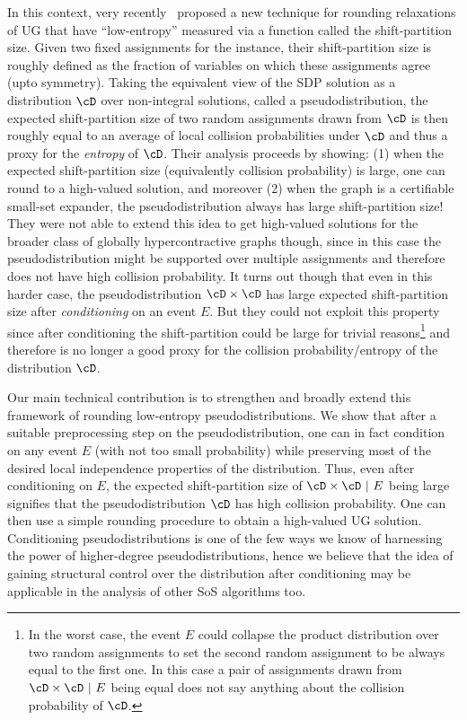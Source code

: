 In this context, very recently~\cite{BBKSS} proposed a new technique for rounding relaxations of UG that have ``low-entropy'' measured via a function called the shift-partition size. Given two fixed assignments for the instance, their shift-partition size is roughly defined as the fraction of variables on which these assignments agree (upto symmetry).
Taking the equivalent view of the SDP solution as a distribution $\cD$ over non-integral solutions, called a pseudodistribution, the expected shift-partition size of two random assignments drawn from $\cD$ is then roughly equal to an average of local collision probabilities under $\cD$ and thus a proxy for the \emph{entropy} of $\cD$. Their analysis proceeds by showing: (1) when the expected shift-partition size (equivalently collision probability) is large, one can round to a high-valued solution, and moreover (2) when the graph is a certifiable small-set expander, the pseudodistribution always has large shift-partition size! They were not able to extend this idea to get high-valued solutions for the broader class of globally hypercontractive graphs though, since in this case the pseudodistribution might be supported over multiple assignments and therefore does not have high collision probability. It turns out though that even in this harder case, the pseudodistribution $\cD \times \cD$ has large expected shift-partition size after \emph{conditioning} on an event $E$. But they could not exploit this property since after conditioning the shift-partition could be large for trivial reasons\footnote{In the worst case, the event $E$ could collapse the product distribution over two random assignments to set the second random assignment to be always equal to the first one. In this case a pair of assignments drawn from $\cD \times \cD ~|~ E$ being equal does not say anything about the collision probability of $\cD$.} and therefore is no longer a good proxy for the collision probability/entropy of the distribution $\cD$.

Our main technical contribution is to strengthen and broadly extend this framework of rounding low-entropy pseudodistributions. We show that after a suitable preprocessing step on the pseudodistribution, one can in fact condition on any event $E$ (with not too small probability) while preserving most of the desired local independence properties of the distribution. Thus, even after conditioning on $E$, the expected shift-partition size of $\cD\times\cD ~|~ E$ being large signifies that the pseudodistribution $\cD$ has high collision probability. One can then use a simple rounding procedure to obtain a high-valued UG solution. Conditioning pseudodistributions is one of the few ways we know of harnessing the power of higher-degree pseudodistributions, hence we believe that the idea of gaining structural control over the distribution after conditioning may be applicable in the analysis of other SoS algorithms too.

